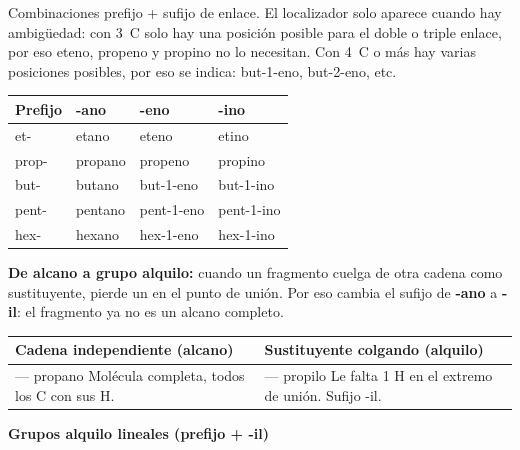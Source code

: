 Combinaciones prefijo + sufijo de enlace. El localizador solo aparece cuando hay
ambigüedad: con 3~C solo hay una posición posible para el doble o triple enlace,
por eso eteno, propeno y propino no lo necesitan. Con 4~C o más hay varias
posiciones posibles, por eso se indica: but-1-eno, but-2-eno, etc.

\renewcommand{\arraystretch}{1.3}
\begin{longtable}{C{2.0cm} C{3.5cm} C{3.5cm} C{3.5cm}}
\toprule
\textbf{Prefijo} & \textbf{-ano} & \textbf{-eno} & \textbf{-ino} \\
\midrule\endhead\bottomrule\endlastfoot
et-   & etano   & eteno      & etino      \\
prop- & propano & propeno    & propino    \\
but-  & butano  & but-1-eno  & but-1-ino  \\
pent- & pentano & pent-1-eno & pent-1-ino \\
hex-  & hexano  & hex-1-eno  & hex-1-ino  \\
\end{longtable}

\textbf{De alcano a grupo alquilo:} cuando un fragmento cuelga de otra cadena como
sustituyente, pierde un  en el punto de unión. Por eso cambia el sufijo de
\textbf{-ano} a \textbf{-il}: el fragmento ya no es un alcano completo.

\begin{center}
\renewcommand{\arraystretch}{1.4}
\begin{longtable}{L{6.5cm} L{6.5cm}}
\toprule
\textbf{Cadena independiente (alcano)} & \textbf{Sustituyente colgando (alquilo)} \\
\midrule\endhead\bottomrule\endlastfoot
{} --- propano \newline Molécula completa, todos los C con sus H.
&  --- propilo \newline Le falta 1 H en el extremo de unión. Sufijo -il. \\
\end{longtable}
\end{center}

\textbf{Grupos alquilo lineales (prefijo + -il)}

